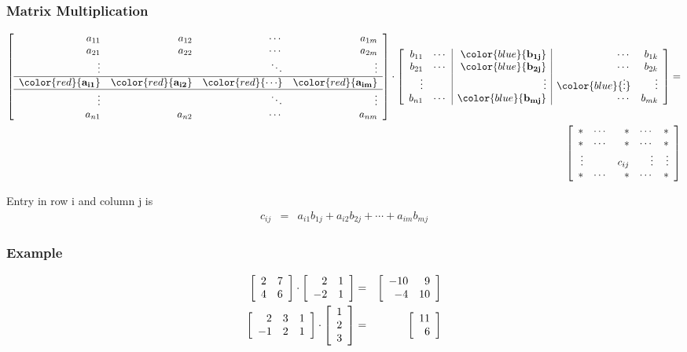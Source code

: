 \begin{frame}
  \frametitle{Matrix Multiplication}

  \begin{eqnarray*}
    \left[
    \begin{array}{rrrr}
      a_{11} & a_{12} & \cdots & a_{1m} \\
      a_{21} & a_{22} & \cdots & a_{2m} \\
      \vdots &       & \ddots & \vdots \\ \hline
      \color{red}{\mathbf{a_{i1}}} & \color{red}{\mathbf{a_{i2}}} & \color{red}{\mathbf{\cdots}} & \color{red}{\mathbf{a_{im}}} \\ \hline
      \vdots &       & \ddots & \vdots \\
      a_{n1} & a_{n2} & \cdots & a_{nm}
    \end{array}
  \right] \cdot
    \left[
    \begin{array}{rr|r|rr}
      b_{11}  & \cdots & \color{blue}{\mathbf{b_{1j}}} & \cdots  & b_{1k} \\
      b_{21}  & \cdots & \color{blue}{\mathbf{b_{2j}}} & \cdots  & b_{2k} \\
      \vdots &        & \vdots & \color{blue}{\mathbf{\vdots}} & \vdots \\
      b_{n1}  & \cdots & \color{blue}{\mathbf{b_{mj}}}  & \cdots & b_{mk}
    \end{array}
  \right]  =  \\
    \left[
    \begin{array}{rrrrr}
      * & \cdots & * & \cdots  &  * \\
      *  & \cdots & *  & \cdots  &  * \\
      \vdots &        & c_{ij} & \vdots & \vdots \\
      * & \cdots & *  & \cdots & *
    \end{array}
  \right]
  \end{eqnarray*}

  Entry in row i and column j is 
  \begin{eqnarray*}
    c_{ij} & = & a_{i1}b_{1j} + a_{i2}b_{2j} + \cdots + a_{im}b_{mj}
  \end{eqnarray*}

\end{frame}


\begin{frame}
  \frametitle{Example}

  \begin{eqnarray*}
    \left[ \begin{array}{rr} 2 & 7 \\ 4 & 6 \end{array} \right] \cdot \left[ \begin{array}{rr} 2 & 1 \\ -2 & 1 \end{array} \right] & = & 
    \left[ \begin{array}{rr} -10 & 9 \\ -4 & 10 \end{array} \right] \\
    \left[
      \begin{array}{rrr}
        2 & 3 & 1 \\ -1 & 2 & 1
      \end{array}
    \right] \cdot
    \left[
      \begin{array}{r}
        1 \\ 2 \\ 3
      \end{array}
    \right]
    & = & 
    \left[ \begin{array}{r} 11 \\ 6 \end{array} \right]
  \end{eqnarray*}

\end{frame}

